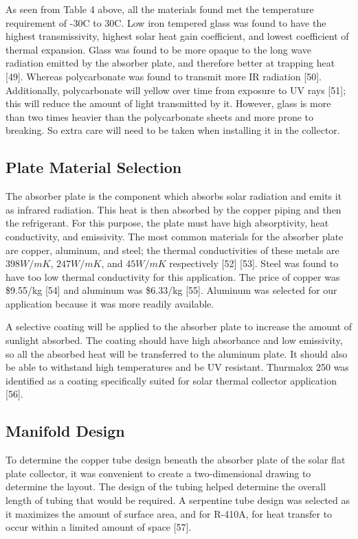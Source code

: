 \medskip
As seen from Table 4 above, all the materials found met the temperature requirement of -30\textdegree C to 30\textdegree C. Low iron tempered glass was found to have the highest transmissivity, highest solar heat gain coefficient, and lowest coefficient of thermal expansion. Glass was found to be more opaque to the long wave radiation emitted by the absorber plate, and therefore better at trapping heat [49]. Whereas polycarbonate was found to transmit more IR radiation [50]. Additionally, polycarbonate will yellow over time from exposure to UV rays [51]; this will reduce the amount of light transmitted by it. However, glass is more than two times heavier than the polycarbonate sheets and more prone to breaking. So extra care will need to be taken when installing it in the collector.

\subsection{Plate Material Selection}

The absorber plate is the component which absorbs solar radiation and emits it as infrared radiation. This heat is then absorbed by the copper piping and then the refrigerant. For this purpose, the plate must have high absorptivity, heat conductivity, and emissivity. The most common materials for the absorber plate are copper, aluminum, and steel; the thermal conductivities of these metals are $398 W/mK$, $247 W/mK$, and $45 W/mK$ respectively [52] [53]. Steel was found to have too low thermal conductivity for this application. The price of copper was \$9.55/kg [54] and aluminum was \$6.33/kg [55]. Aluminum was selected for our application because it was more readily available.

\medskip
A selective coating will be applied to the absorber plate to increase the amount of sunlight absorbed. The coating should have high absorbance and low emissivity, so all the absorbed heat will be transferred to the aluminum plate. It should also be able to withstand high temperatures and be UV resistant. Thurmalox 250 was identified as a coating specifically suited for solar thermal collector application [56].

\subsection{Manifold Design}

To determine the copper tube design beneath the absorber plate of the solar flat plate collector, it was convenient to create a two-dimensional drawing to determine the layout. The design of the tubing helped determine the overall length of tubing that would be required. A serpentine tube design was selected as it maximizes the amount of surface area, and for R-410A, for heat transfer to occur within a limited amount of space [57].

